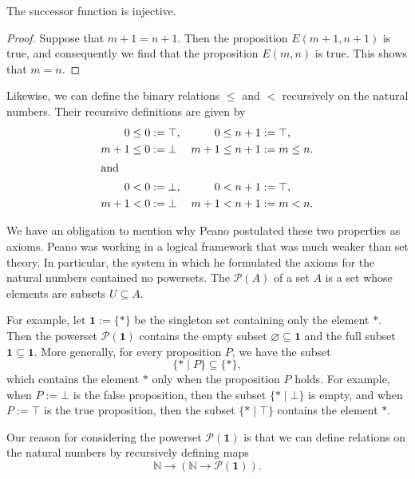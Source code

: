 \begin{theorem}
  The successor function is injective.
\end{theorem}

\begin{proof}
  Suppose that $m+1=n+1$. Then the proposition $E(m+1,n+1)$ is true, and consequently we find that the proposition $E(m,n)$ is true. This shows that $m=n$.
\end{proof}

\begin{example}
  Likewise, we can define the binary relations $\leq$ and $<$ recursively on the natural numbers. Their recursive definitions are given by
  \begin{align*}
    0 \leq 0 & := \top, & 0\leq n+1 & := \top, \\
    m+1 \leq 0 & := \bot & m+1 \leq n+1 & := m \leq n. \\
    \intertext{and}
    0 < 0 & := \bot, & 0 < n+1 & := \top, \\
    m+1 < 0 & := \bot & m+1 < n+1 & := m < n.
  \end{align*}
\end{example}

\begin{remark}
  We have an obligation to mention why Peano postulated these two properties as axioms. Peano was working in a logical framework that was much weaker than set theory. In particular, the system in which he formulated the axioms for the natural numbers contained no powersets. The  $\mathcal{P}(A)$ of a set $A$ is a set whose elements are subsets $U\subseteq A$.
  
  For example, let $\symbf{1}:=\{\ast\}$ be the singleton set containing only the element $\ast$. Then the powerset $\mathcal{P}(\symbf{1})$ contains the empty subset $\varnothing\subseteq \symbf{1}$ and the full subset $\symbf{1}\subseteq\symbf{1}$. More generally, for every proposition $P$, we have the subset
  \begin{equation*}
    \{\ast\mid P\}\subseteq \{\ast\},
  \end{equation*}
  which contains the element $\ast$ only when the proposition $P$ holds. For example, when $P:=\bot$ is the false proposition, then the subset $\{\ast\mid\bot\}$ is empty, and when $P:=\top$ is the true proposition, then the subset $\{\ast\mid\top\}$ contains the element $\ast$.
  
  Our reason for considering the powerset $\mathcal{P}(\symbf{1})$ is that we can define relations on the natural numbers by recursively defining maps
  \begin{equation*}
    \mathbb{N}\to (\mathbb{N}\to \mathcal{P}(\symbf{1})).
  \end{equation*}
\end{remark}

